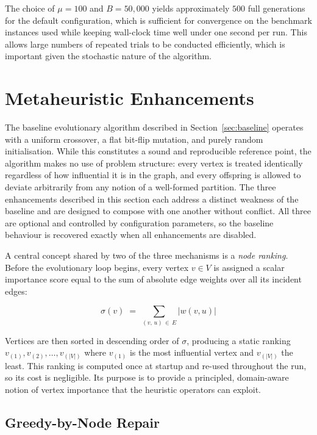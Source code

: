 \documentclass[12pt]{article}
\begin{document}
The choice of $\mu = 100$ and $B = 50{,}000$ yields approximately $500$ full
generations for the default configuration, which is sufficient for convergence on
the benchmark instances used while keeping wall-clock time well under one second
per run.
This allows large numbers of repeated trials to be conducted efficiently, which is
important given the stochastic nature of the algorithm.

\section{Metaheuristic Enhancements}
\label{sec:metaheuristics}

The baseline evolutionary algorithm described in Section~\ref{sec:baseline} operates
with a uniform crossover, a flat bit-flip mutation, and purely random initialisation.
While this constitutes a sound and reproducible reference point, the algorithm makes
no use of problem structure: every vertex is treated identically regardless of how
influential it is in the graph, and every offspring is allowed to deviate arbitrarily
from any notion of a well-formed partition.
The three enhancements described in this section each address a distinct weakness of
the baseline and are designed to compose with one another without conflict.
All three are optional and controlled by configuration parameters, so the baseline
behaviour is recovered exactly when all enhancements are disabled.

A central concept shared by two of the three mechanisms is a \emph{node ranking}.
Before the evolutionary loop begins, every vertex $v \in V$ is assigned a scalar
importance score equal to the sum of absolute edge weights over all its incident
edges:

\begin{equation}
    \sigma(v) \;=\; \sum_{(v,\,u)\,\in\,E} |w(v, u)|
\end{equation}

Vertices are then sorted in descending order of $\sigma$, producing a static ranking
$v_{(1)}, v_{(2)}, \ldots, v_{(|V|)}$ where $v_{(1)}$ is the most influential vertex
and $v_{(|V|)}$ the least.
This ranking is computed once at startup and re-used throughout the run, so its cost
is negligible.
Its purpose is to provide a principled, domain-aware notion of vertex importance that
the heuristic operators can exploit.

\subsection{Greedy-by-Node Repair}
\label{sec:greedy-repair}
\end{document}
